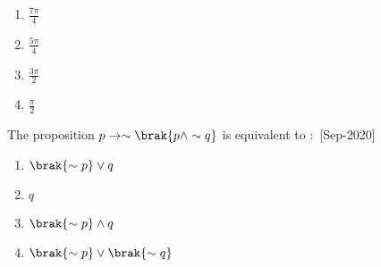         \begin{enumerate}
            \item $\frac{7\pi}{4}$
            \item $\frac{5\pi}{4}$
            \item $\frac{3\pi}{2}$
            \item $\frac{\pi}{2}$
        \end{enumerate}
    \item The proposition $p \rightarrow \sim \brak{p\wedge \sim q}$ is equivalent to $\colon$
    \hfill{[Sep-2020]}
        \begin{enumerate}
            \item $\brak{\sim p}\vee q$
            \item $q$
            \item $\brak{\sim p}\wedge q$
            \item $\brak{\sim p}\vee \brak{\sim q}$
        \end{enumerate}
